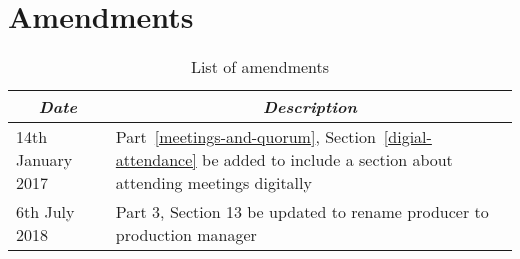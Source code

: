 \clearpage
\section{Amendments}
\begin{table}[!htbp]
  \def\arraystretch{1.5}
  \begin{tabular}{l|l}
    \multicolumn{1}{c}{\textit{Date}} &\multicolumn{1}{c}{\textit{Description}}  \\ \hline\hline
    14th January 2017 & Part~\ref{meetings-and-quorum}, Section~\ref{digial-attendance} be added to include a section about attending meetings digitally  \\
    6th July 2018 & Part 3, Section 13 be updated to rename producer to production manager
  \end{tabular}
  \caption{List of amendments}
  \label{tab:amendments}
\end{table}
